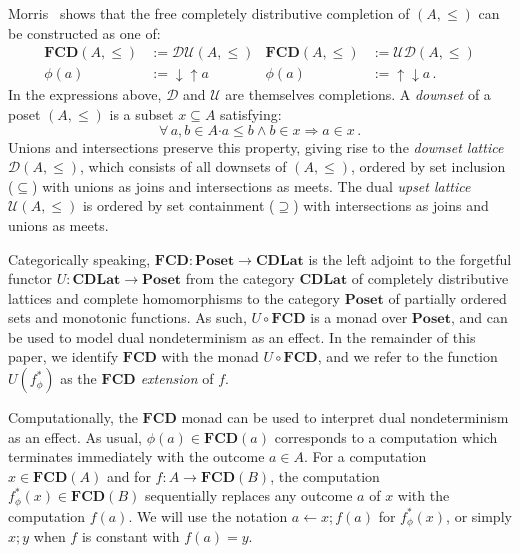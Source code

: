 \documentclass[sigplan,screen]{acmart}
\newcommand{\bdot}{\boldsymbol{\cdot}}
\begin{document}
Morris~\cite{augtyp} shows that
the free completely distributive completion of $(A, \le)$
can be constructed as one of:
\begin{align*}
  \mathbf{FCD}(A, {\le}) &:= \mathcal{D} \mathcal{U}(A, {\le}) &
  \mathbf{FCD}(A, {\le}) &:= \mathcal{U} \mathcal{D}(A, {\le}) \\
  \phi(a) &:= {\downarrow}{\uparrow} a &
  \phi(a) &:= {\uparrow}{\downarrow} a \,.
\end{align*}
In the expressions above,
$\mathcal{D}$ and $\mathcal{U}$
are themselves completions.
A \emph{downset} of a poset $(A, {\le})$
is a subset $x \subseteq A$ satisfying:
\[
  \forall \, a, b \in A \bdot
          a \le b \wedge b \in x \Rightarrow a \in x \,.
\]
Unions and intersections preserve this property,
giving rise to the \emph{downset lattice} $\mathcal{D}(A, {\le})$,
which consists of all downsets of $(A, {\le})$,
ordered by set inclusion (${\subseteq}$) with
unions as joins and intersections as meets.
The dual \emph{upset lattice} $\mathcal{U}(A, {\le})$
is ordered by set containment (${\supseteq}$) with
intersections as joins and unions as meets.

Categorically speaking,
$\mathbf{FCD} : \mathbf{Poset} \rightarrow \mathbf{CDLat}$
is the left adjoint to the forgetful functor
$U : \mathbf{CDLat} \rightarrow \mathbf{Poset}$
from the category $\mathbf{CDLat}$
of completely distributive lattices and complete homomorphisms
to the category $\mathbf{Poset}$
of partially ordered sets and monotonic functions.
As such, $U \! \circ \mathbf{FCD}$ is a monad over $\mathbf{Poset}$,
and can be used to model dual nondeterminism
as an effect.
In the remainder of this paper,
we identify $\mathbf{FCD}$ with
the monad $U \! \circ \mathbf{FCD}$,
and we refer to the function
$U(f_\phi^*)$ as the \emph{$\mathbf{FCD}$ extension} of $f$.

Computationally,
the $\mathbf{FCD}$ monad can be used to interpret
dual nondeterminism as an effect.
As usual,
$\phi(a) \in \mathbf{FCD}(a)$
corresponds to a computation which
terminates immediately with the outcome $a \in A$.
For a computation $x \in \mathbf{FCD}(A)$
and for $f : A \rightarrow \mathbf{FCD}(B)$,
the computation $f_\phi^*(x) \in \mathbf{FCD}(B)$
sequentially replaces
any outcome $a$ of $x$ with the computation $f(a)$.
We will use the notation
$a \leftarrow x ; f(a)$ for $f^*_\phi(x)$,
or simply $x ; y$ when $f$ is constant with $f(a) = y$.
\end{document}
